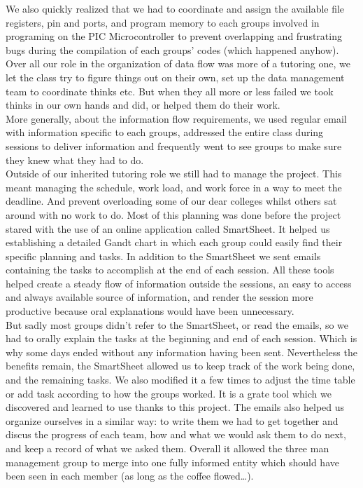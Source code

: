 \documentclass[12pt]{article}
\begin{document}
	We also quickly realized that we had to coordinate and assign the available file registers, pin and ports, and program memory to each groups involved in programing on the PIC Microcontroller to prevent overlapping and frustrating bugs during the compilation of each groups’ codes (which happened anyhow).\\

	Over all our role in the organization of data flow was more of a tutoring one, we let the class try to figure things out on their own, set up the data management team to coordinate thinks etc. But when they all more or less failed we took thinks in our own hands and did, or helped them do their work.\\
	More generally, about the information flow requirements, we used regular email with information specific to each groups, addressed the entire class during sessions to deliver information and frequently went to see groups to make sure they knew what they had to do.\\

	Outside of our inherited tutoring role we still had to manage the project. This meant managing the schedule, work load, and work force in a way to meet the deadline. And prevent overloading some of our dear colleges whilst others sat around with no work to do. Most of this planning was done before the project stared with the use of an online application called SmartSheet. It helped us establishing a detailed Gandt chart in which each group could easily find their specific planning and tasks. In addition to the SmartSheet we sent emails containing the tasks to accomplish at the end of each session. All these tools helped create a steady flow of information outside the sessions, an easy to access and always available source of information, and render the session more productive because oral explanations would have been unnecessary.\\

	But sadly most groups didn’t refer to the SmartSheet, or read the emails, so we had to orally explain the tasks at the beginning and end of each session. Which is why some days ended without any information having been sent. Nevertheless the benefits remain, the SmartSheet allowed us to keep track of the work being done, and the remaining tasks. We also modified it a few times to adjust the time table or add task according to how the groups worked. It is a grate tool which we discovered and learned to use thanks to this project. The emails also helped us organize ourselves in a similar way: to write them we had to get together and discus the progress of each team, how and what we would ask them to do next, and keep a record of what we asked them. Overall it allowed the three man management group to merge into one fully informed entity which should have been seen in each member (as long as the coffee flowed…).
\end{document}
